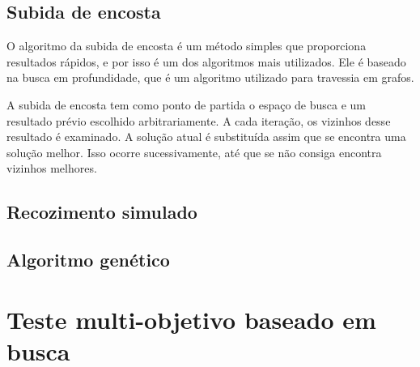 \subsection{Subida de encosta}

O algoritmo da subida de encosta é um método simples que proporciona resultados rápidos, e por isso é um dos algoritmos mais utilizados. Ele é baseado na busca em profundidade, que é um algoritmo utilizado para travessia em grafos. 

A subida de encosta tem como ponto de partida o espaço de busca e um resultado prévio escolhido arbitrariamente. A cada iteração, os vizinhos desse resultado é examinado. A solução atual é substituída assim que se encontra uma solução melhor. Isso ocorre sucessivamente, até que se não consiga encontra vizinhos melhores.  

\subsection{Recozimento simulado}

\subsection{Algoritmo genético}

\section{Teste multi-objetivo baseado em busca}











